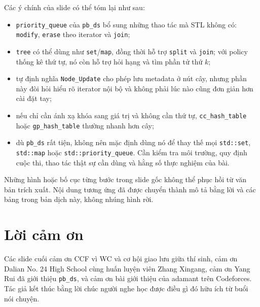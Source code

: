 \documentclass[11pt]{article}
\begin{document}
Các ý chính của slide có thể tóm lại như sau:
\begin{itemize}
  \item \texttt{priority\_queue} của \texttt{pb\_ds} bổ sung những thao tác mà
  STL không có: \texttt{modify}, \texttt{erase} theo iterator và
  \texttt{join};
  \item \texttt{tree} có thể dùng như \texttt{set}/\texttt{map}, đồng thời hỗ
  trợ \texttt{split} và \texttt{join}; với policy thống kê thứ tự, nó còn hỗ
  trợ hỏi hạng và tìm phần tử thứ $k$;
  \item tự định nghĩa \texttt{Node\_Update} cho phép lưu metadata ở nút cây,
  nhưng phần này đòi hỏi hiểu rõ iterator nội bộ và không phải lúc nào cũng
  đơn giản hơn cài đặt tay;
  \item nếu chỉ cần ánh xạ khóa sang giá trị và không cần thứ tự,
  \texttt{cc\_hash\_table} hoặc \texttt{gp\_hash\_table} thường nhanh hơn cây;
  \item dù \texttt{pb\_ds} rất tiện, không nên mặc định dùng nó để thay thế
  mọi \texttt{std::set}, \texttt{std::map} hoặc \texttt{std::priority\_queue}.
  Cần kiểm tra môi trường, quy định cuộc thi, thao tác thật sự cần dùng và
  hằng số thực nghiệm của bài.
\end{itemize}

Những hình hoặc bố cục từng bước trong slide gốc không thể phục hồi từ văn bản
trích xuất. Nội dung tương ứng đã được chuyển thành mô tả bằng lời và các bảng
trong bản dịch này, không nhúng hình rời.

\section*{Lời cảm ơn}

Các slide cuối cảm ơn CCF vì WC và cơ hội giao lưu giữa thí sinh, cảm ơn
Dalian No. 24 High School cùng huấn luyện viên Zhang Xingang, cảm ơn Yang Rui
đã giới thiệu \texttt{pb\_ds}, và cảm ơn bài giới thiệu của adamant trên
Codeforces. Tác giả kết thúc bằng lời chúc người nghe học được điều gì đó hữu
ích từ buổi nói chuyện.
\end{document}
